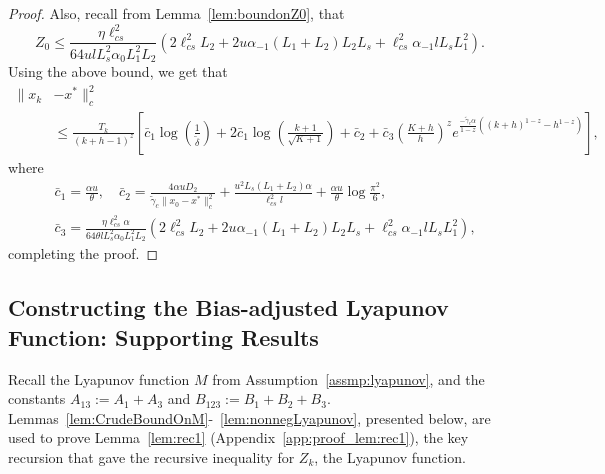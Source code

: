 \documentclass{article}
\newcommand{\lrp}[1]{\left( #1 \right)}
\newcommand{\lcs}{\ell_{cs}}
\begin{document}
\begin{proof}
Also, recall from Lemma~\ref{lem:boundonZ0}, that
\[Z_0 \le \frac{\eta\lcs^2}{64 ul L^2_s \alpha_0 L^2_1 L_2 }\lrp{2\lcs^2 L_2 +  2 u \alpha_{-1} (L_1 + L_2)  L_2 L_s + \lcs^2 \alpha_{-1} l L_s L^2_1 }.\]
Using the above bound, we get that
\begin{align*}
    \|x_k &- x^*\|^2_c \\
    &\le\frac{T_k}{(k+h-1)^z} \left[ \bar{c}_1\log\lrp{\frac{1}{\tilde{\delta}}} + 2\bar{c}_1\log\lrp{\frac{k+1}{\sqrt{K+1}}} + \bar{c}_2 + \bar{c}_3 \lrp{\frac{K+h}{h}}^z e^{\frac{-\tilde{\gamma}_c \alpha}{1-z}\lrp{(k+h)^{1-z} - h^{1-z}}} \right],
\end{align*}
where
\begin{align*}
    &\bar{c}_1 = \frac{\alpha u}{\theta}, \quad \bar{c}_2 = \frac{4 \alpha u D_2 }{\tilde{\gamma}_c\|x_0 - x^*\|^2_c } + \frac{u^2 L_s (L_1 + L_2) \alpha}{\lcs^2 l} + \frac{\alpha u}{\theta}\log\frac{\pi^2}{6}, \\
    &\bar{c}_3 = \frac{\eta\lcs^2 \alpha }{64 \theta l L^2_s \alpha_0 L^2_1 L_2 }\lrp{2\lcs^2 L_2 +  2 u \alpha_{-1} (L_1 + L_2)  L_2 L_s + \lcs^2 \alpha_{-1} l L_s L^2_1 },
\end{align*}
completing the proof.
\end{proof}

\subsection{Constructing the Bias-adjusted Lyapunov Function: Supporting Results}\label{app:LyapunovFunction}
Recall the Lyapunov function $M$  from Assumption~\ref{assmp:lyapunov}, and the constants $A_{13} := A_1 + A_3$ and $B_{123} := B_1 + B_2 + B_3$. Lemmas~\ref{lem:CrudeBoundOnM}-~\ref{lem:nonnegLyapunov}, presented below, are used to prove Lemma~\ref{lem:rec1} (Appendix~\ref{app:proof_lem:rec1}), the key recursion that gave the recursive inequality for $Z_k$, the Lyapunov function. 
\end{document}
